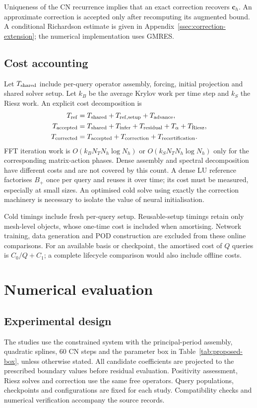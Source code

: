 \documentclass[11pt]{amsart}
\theoremstyle{remark}
\newcommand{\cc}{\mathbf c}
\begin{document}
Uniqueness of the CN recurrence implies that an exact correction recovers
$\cc_h$. An approximate correction is accepted only after recomputing its
augmented bound. A conditional Richardson estimate is given in
Appendix~\ref{ssec:correction-extension}; the numerical implementation
uses GMRES.

\subsection{Cost accounting}
\label{ssec:cost}
Let $T_{\rm shared}$ include per-query operator assembly, forcing,
initial projection and shared solver setup. Let $k_B$ be the average Krylov
work per time step and $k_S$ the Riesz work. An explicit cost decomposition is
\begin{equation}
\begin{aligned}
 T_{\rm ref}&=T_{\rm shared}+T_{\rm ref,setup}+T_{\rm advance},\\
 T_{\rm accepted}&=T_{\rm shared}+T_{\rm infer}+T_{\rm residual}
                   +T_{\alpha}+T_{\rm Riesz},\\
 T_{\rm corrected}&=T_{\rm accepted}+T_{\rm correction}
                         +T_{\rm recertification}.
\end{aligned}
\label{eq:cost-model}
\end{equation}
FFT iteration work is $O(k_BN_TN_h\log N_h)$ or
$O(k_SN_TN_h\log N_h)$ only for the corresponding matrix-action phases.
Dense assembly and spectral decomposition have different costs and are not
covered by this count. A dense LU reference factorises $B_+$ once per query
and reuses it over time; its cost must be measured, especially at small sizes.
An optimised cold solve using exactly the correction machinery is necessary
to isolate the value of neural initialisation.


Cold timings include fresh per-query setup. Reusable-setup timings retain
only mesh-level objects, whose one-time cost is included when amortising.
Network training, data generation and POD construction are excluded from
these online comparisons. For an available basis or checkpoint, the
amortised cost of $Q$ queries is $C_0/Q+C_1$; a complete lifecycle comparison
would also include offline costs.
\section{Numerical evaluation}
\label{sec:numerics}
\subsection{Experimental design}
The studies use the constrained system with the principal-period assembly,
quadratic splines, 60 CN steps and the parameter box in
Table~\ref{tab:proposed-box}, unless otherwise stated. All candidate
coefficients are projected to the prescribed boundary values before
residual evaluation. Positivity assessment, Riesz solves and correction
use the same free operators. Query populations, checkpoints and configurations are fixed for each study.
Compatibility checks and numerical verification accompany the source records.
\end{document}

